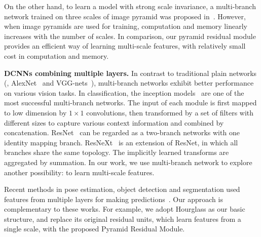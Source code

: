 \documentclass[10pt,twocolumn,letterpaper]{article}
\newcommand{\smalltitle}[1]{\vspace{0.2em}\noindent \textbf{{#1}}}
\begin{document}
On the other hand, to learn a model with strong scale invariance, a multi-branch network trained on three scales of image pyramid was proposed in~\cite{tompson2015efficient}. However, when image pyramids are used for training,  computation and memory linearly increases with the number of scales. In comparison, our pyramid residual module provides an efficient way of learning multi-scale features, with relatively small cost in computation and memory.





\smalltitle{DCNNs combining multiple layers. }
In contrast to traditional plain networks (\eg, AlexNet~\cite{krizhevsky2012imagenet} and VGG-nets~\cite{simonyan2014very}), multi-branch networks exhibit better performance on various vision tasks. 
In classification, the inception models~\cite{szegedy2015going,ioffe2015batch,szegedy2016rethinking,szegedy2016inception} are one of the most successful multi-branch networks. 
The input of each module is first mapped to low dimension by $1\times1$ convolutions, then transformed by a set of filters with different sizes to capture various context information and combined by concatenation. 
ResNet~\cite{he2016deep,he2016identity} can be regarded as a two-branch networks with one identity mapping branch. 
ResNeXt~\cite{xie2016aggregated} is an extension of ResNet, in which all branches share the same topology. The implicitly learned transforms are aggregated by summation. In our work, we use multi-branch network to explore another possibility: to learn multi-scale features. 

Recent methods in pose estimation, object detection and segmentation used features from multiple layers for making predictions~\cite{liu2016ssd,cai2016unified, hariharan2015hypercolumns,bell2016inside,newell2016stacked,chen2016deeplab}. Our approach is complementary to these works. 
For example, we adopt Hourglass as our basic structure, and replace its original residual units, which learn features from a single scale, with the proposed Pyramid Residual Module. 



																																				 
\end{document}
